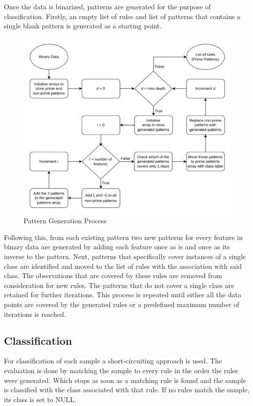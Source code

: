 \documentclass[pdflatex,sn-mathphys-num]{sn-jnl}%
\let\oldcaption\caption
\renewcommand{\caption}[1]{\oldcaption{\centering #1}}
\theoremstyle{thmstyleone}%
\theoremstyle{thmstyletwo}%
\theoremstyle{thmstylethree}%
\begin{document}
Once the data is binarized, patterns are generated for the purpose of classification.
Firstly, an empty list of rules and list of patterns that contains a single blank pattern is generated as a starting point.

\begin{figure}[ht!]
    \centering
    \includegraphics[width=0.8\linewidth]{Pattern.drawio.png}
    \caption{Pattern Generation Process}
    \label{fig:PatternGeneration}
\end{figure}

Following this, from each existing pattern two new patterns for every feature in binary data are generated by adding each feature once as is and once as its inverse to the pattern.
Next, patterns that specifically cover instances of a single class are identified and moved to the list of rules with the association with said class.
The observations that are covered by these rules are removed from consideration for new rules.
The patterns that do not cover a single class are retained for further iterations.
This process is repeated until either all the data points are covered by the generated rules or a predefined maximum number of iterations is reached.

\subsection{Classification}
For classification of each sample a short-circuiting approach is used.
The evaluation is done by matching the sample to every rule in the order the rules were generated.
Which stops as soon as a matching rule is found and the sample is classified with the class associated with that rule.
If no rules match the sample, its class is set to NULL.
\end{document}
